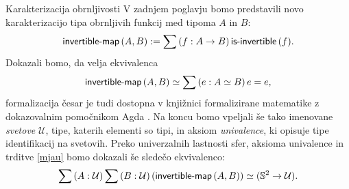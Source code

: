 \documentclass[a4paper, slovene]{article}
\begin{document}
\begin{section}{Karakterizacija obrnljivosti}
  V zadnjem poglavju bomo predstavili novo karakterizacijo
  tipa obrnljivih funkcij med tipoma \(A\) in \(B\):
  \begin{equation}
    \label{mjau}
      \textnormal{\textsf{invertible-map}}\,(A, B) := \sum \left( f : A \to B \right) \textnormal{\textsf{is-invertible}}\,(f).
  \end{equation}
  Dokazali bomo, da velja ekvivalenca
  \[\textnormal{\textsf{invertible-map}}\,(A, B) \simeq \sum \left( e : A \simeq B \right) e = e,\]
  formalizacija česar je tudi dostopna v knjižnici formalizirane matematike z dokazovalnim
  pomočnikom Agda \cite{agda-unimath}.
  Na koncu bomo vpeljali še tako imenovane \emph{svetove} \(\mathcal{U}\), tipe, katerih elementi so
  tipi, in aksiom \emph{univalence}, ki opisuje tipe identifikacij na svetovih.
  Preko univerzalnih lastnosti sfer, aksioma univalence in trditve \ref{mjau}
  bomo dokazali še sledečo ekvivalenco:
  \[\sum \left( A : \mathcal{U} \right) \sum \left( B : \mathcal{U} \right) (\textnormal{\textsf{invertible-map}}\,(A, B)) \simeq
    (\mathbb{S}^{2} \to \mathcal{U}).\]
\end{section}
\printbibliography
\end{document}
